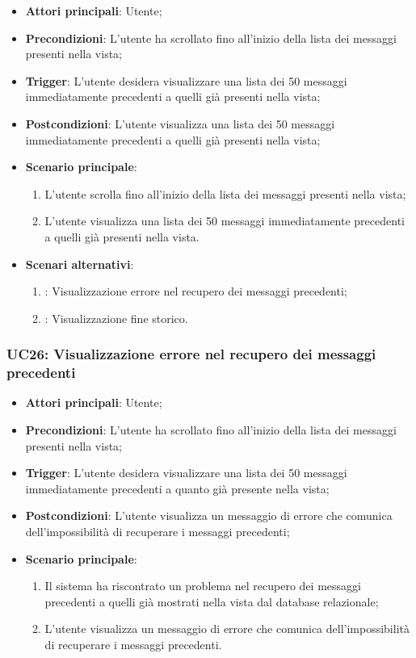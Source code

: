 \begin{itemize}
    \item \textbf{Attori principali}: Utente;
    \item \textbf{Precondizioni}: L'utente ha scrollato fino all'inizio della lista dei messaggi presenti nella vista;
    \item \textbf{Trigger}: L'utente desidera visualizzare una lista dei 50 messaggi immediatamente precedenti a quelli già presenti nella vista;
    \item \textbf{Postcondizioni}: L'utente visualizza una lista dei 50 messaggi immediatamente precedenti a quelli già presenti nella vista;
    \item \textbf{Scenario principale}:
    \begin{enumerate}
        \item L'utente scrolla fino all'inizio della lista dei messaggi presenti nella vista;
        \item L'utente visualizza una lista dei 50 messaggi immediatamente precedenti a quelli già presenti nella vista.
    \end{enumerate}
    \item \textbf{Scenari alternativi}:
    \begin{enumerate}
        \item {}: Visualizzazione errore nel recupero dei messaggi precedenti;
        \item {}: Visualizzazione fine storico.
    \end{enumerate}
\end{itemize}

\hypertarget{UC26}{}
\subsubsection{UC26: Visualizzazione errore nel recupero dei messaggi precedenti}
\begin{itemize}
    \item \textbf{Attori principali}: Utente;
    \item \textbf{Precondizioni}: L'utente ha scrollato fino all'inizio della lista dei messaggi presenti nella vista;
    \item \textbf{Trigger}: L'utente desidera visualizzare una lista dei 50 messaggi immediatamente precedenti a quanto già presente nella vista;
    \item \textbf{Postcondizioni}: L'utente visualizza un messaggio di errore che comunica dell'impossibilità di recuperare i messaggi precedenti;
    \item \textbf{Scenario principale}: 
    \begin{enumerate}
        \item Il sistema ha riscontrato un problema nel recupero dei messaggi precedenti a quelli già mostrati nella vista dal database relazionale;
        \item L'utente visualizza un messaggio di errore che comunica dell'impossibilità di recuperare i messaggi precedenti.
    \end{enumerate}
\end{itemize}